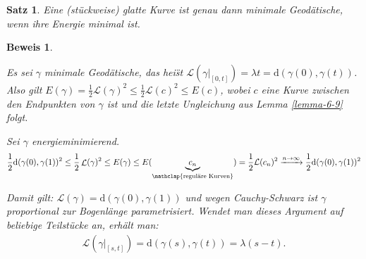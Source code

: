 \documentclass[paper=A4, twoside, chapterprefix=true, bibliography=totoc, headsepline]{scrbook}
\DeclareMathOperator{\calL}{\mathcal{L}}
\newcommand{\dop}{\mathrm{d}}
\theoremstyle{plain}
\newtheorem{Satz}[Dfn]{Satz}
\theoremstyle{nonumberplain}
\newtheorem{bew}{Beweis}
\theoremstyle{empty}
\theoremstyle{break}
\newcommand{\quot}[1]{\textrm{\glqq}{#1}\textrm{\grqq}}
\begin{document}
\begin{Satz}
  Eine (st\"uckweise) glatte Kurve ist genau dann minimale Geod\"atische, wenn ihre Energie minimal ist.
\end{Satz}

\begin{bew}\begin{description}[font=\normalfont]
  \item[\quot{$\Rightarrow$}:]
    Es sei $\gamma$ minimale Geod\"atische, das hei\"st $\mathcal L(\gamma|_{[0,t]}) = \lambda t = \dop (\gamma(0),\gamma(t))$.
    Also gilt $E(\gamma) = \frac{1}2 \mathcal L(\gamma)^2 \leq \frac{1}2 \mathcal L(c)^2 \leq E(c)$, wobei $c$ eine Kurve zwischen den Endpunkten von $\gamma$ ist und die letzte Ungleichung aus Lemma \ref{lemma-6-9} folgt.
  \item[\quot{$\Leftarrow$}:]
    Sei $\gamma$ energieminimierend.
    \begin{align*}
      \frac{1}2 \dop (\gamma(0), \gamma(1))^2 \leq \frac{1}2 \calL(\gamma)^2 \leq E(\gamma) \leq E(\underbrace{c_n}_{\mathclap{\text{regul\"are Kurven}}}) = \frac{1}2 \mathcal L(c_n)^2 \xrightarrow{n\to\infty} \frac{1}2 \dop(\gamma(0),\gamma(1))^2
    \end{align*}
    \begin{center}\end{center}

	Damit gilt: $\mathcal L(\gamma) = \dop(\gamma(0),\gamma(1))$ und wegen Cauchy-Schwarz ist $\gamma$ proportional zur Bogenl\"ange parametrisiert.
	Wendet man dieses Argument auf beliebige Teilst\"ucke an, erh\"alt man:
	\begin{align*}
		\mathcal L(\gamma|_{[s,t]}) = \dop(\gamma(s),\gamma(t)) = \lambda(s-t).
	\end{align*}
\end{description}\end{bew}
\end{document}
